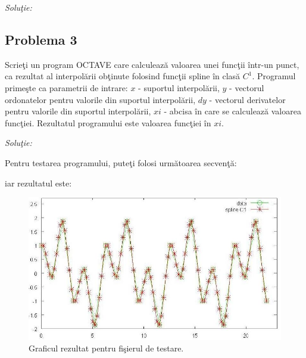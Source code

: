 \documentclass{exam}
\newcommand{\octavescript}[2]{
	
}
\begin{document}
\textit{Soluţie:}

\octavescript{./src/Neville.m}{Metoda Neville de interpolare.}



\subsection{Problema 3}
Scrieţi un program OCTAVE care calculează valoarea unei funcţii într-un punct, ca rezultat al interpolării obţinute folosind funcţii spline în clasă $C^1$. Programul primeşte ca parametrii de intrare: $x$ - suportul interpolării, $y$ - vectorul ordonatelor pentru valorile din suportul interpolării, $dy$ - vectorul derivatelor pentru valorile din suportul interpolării, $xi$ - abcisa în care se calculează valoarea funcţiei. Rezultatul programului este valoarea funcţiei în $xi$.

\textit{Soluţie:}

\octavescript{./src/SplineC1.m}{Interpolare cu funcţii spline în clasă $C^1$.}

Pentru testarea programului, puteţi folosi următoarea secvenţă:

\octavescript{./src/testsplineC1.m}{Fişier de testare.}

iar rezultatul este:

\begin{figure}[ht]
	\centering
	\includegraphics[width=165mm]{./img/splineC1.jpg}
	\caption{Graficul rezultat pentru fişierul de testare.}
	\label{bezi}
\end{figure}
\end{document}
